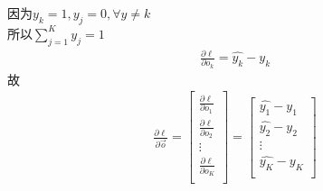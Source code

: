 \documentclass[12pt,a4paper]{article}
\begin{document}
因为$y_k = 1, y_j = 0,\forall y\neq k$\\
所以$\sum_{j = 1}^{K}{y_j} = 1$
\begin{align*}
    \frac{\partial \ell}{\partial o_k} = \hat{y_k} - y_k
\end{align*}
故
\begin{align*}
    \frac{\partial \ell}{\partial \vec{o}} =
    \begin{bmatrix}
        \frac{\partial \ell}{\partial o_1} \\
        \frac{\partial \ell}{\partial o_2} \\
        \vdots                             \\
        \frac{\partial \ell}{\partial o_K} \\
    \end{bmatrix} =
    \begin{bmatrix}
        \hat{y_1} - y_1 \\
        \hat{y_2} - y_2 \\
        \vdots          \\
        \hat{y_K} - y_K \\
    \end{bmatrix}
\end{align*}
\end{document}
